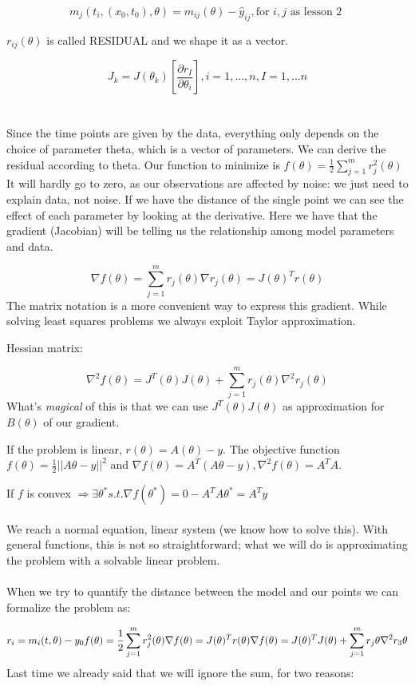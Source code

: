$$
m_j(t_i,(x_0,t_0), \theta) = m_{ij}(\theta) - \hat{y}_{ij}, \text{for } i,j \text{ as lesson 2 } 
$$

$r_{ij}(\theta)$ is called RESIDUAL and we shape it as a vector.

$$
J_k=J(\theta_k)[\frac{\partial r_I}{\partial\theta_i}], i=1, ...,n, I=1,...n
$$
\\
\\
\noindent
Since the time points are given by the data, everything only depends on
the choice of parameter theta, which is a vector of parameters. We can
derive the residual according to theta. Our function to minimize is
$f(\theta)=\frac{1}{2}\sum^m_{j=1}r_j^2(\theta)$
\noindent
It will hardly go to zero, as our observations are affected by noise: we
just need to explain data, not noise. If we have the distance of the
single point we can see the effect of each parameter by looking at the
derivative. Here we have that the gradient (Jacobian) will be telling us
the relationship among model parameters and data.

$$
\nabla f(\theta)=\sum^m_{j=1}r_j(\theta)\nabla r_j(\theta)= J(\theta)^Tr(\theta)
$$
\noindent
The matrix notation is a more convenient way to express this gradient.
While solving least squares problems we always exploit Taylor
approximation.

Hessian matrix:

$$
\nabla^2 f(\theta)=J^T(\theta)J(\theta)+ \sum^m_{j=1}r_j(\theta) \nabla^2 r_j(\theta)
$$
\noindent
What's \emph{magical} of this is that we can use $J^T(\theta)J(\theta)$
as approximation for $B(\theta)$ of our gradient.

If the problem is linear, $r(\theta)=A(\theta)-y$. The objective
function $f(\theta)=\frac{1}{2} || A\theta-y||^2$ and
$\nabla f(\theta)=A^T(A\theta-y), \nabla^2 f(\theta)=A^TA$.

If $f$ is convex
$\Rightarrow \exists \theta^* s.t. \nabla f(\theta^*)=0 - A^TA\theta^*=A^Ty$
\\
\\
\noindent
We reach a normal equation, linear system (we know how to solve this). With general functions, this is not so straightforward; what we will do
is approximating the problem with a solvable linear problem.
\\
\\
\noindent
When we try to quantify the distance between the model and our points we can formalize the problem as:

$$
r_i = m_i(t,\theta) - y_0 \\ f(\theta)= \frac{1}{2} \sum^m_{j=1} r_j^2 (\theta) \\ \nabla f(\theta) = J(\theta)^{T} r (\theta) \\ \nabla f(\theta) = J(\theta)^{T} J (\theta) + \sum^m_{j=1} r_j \theta \nabla^2 r_3 \theta\\
$$
\noindent
Last time we already said that we will ignore the sum, for two reasons:

